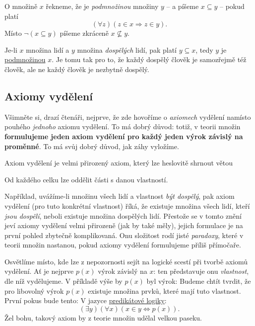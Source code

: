 \begin{definition}[Podmnožina]
  \label{def:podmnozina}
  O množině $x$ řekneme, že je \emph{podmnožinou} množiny $y$ -- a píšeme $x
  \subseteq y$ -- pokud platí
  \begin{equation}
    \label{eq:podmnozina}
    ( \forall z)(z \in x \Rightarrow z \in y).
  \end{equation}
  Místo $\neg (x \subseteq y)$ píšeme zkráceně $x \nsubseteq y$.
\end{definition}
\begin{example}
  \label{exam:podmnozina}
  Je-li $x$ množina lidí a $y$ množina \emph{dospělých} lidí, pak platí $y
  \subseteq x$, tedy $y$ je \hyperref[def:podmnozina]{podmnožinou} $x$. Je tomu
  tak pro to, že každý dospělý člověk je samozřejmě též člověk, ale ne každý
  člověk je nezbytně dospělý.
\end{example}

\subsection{Axiomy vydělení}
\label{ssec:axiomy-vydeleni}

Všimněte si, drazí čtenáři, nejprve, že zde hovoříme o \emph{axiomech} vydělení
namísto pouhého \emph{jednoho} axiomu vydělení. To má dobrý důvod: totiž, v
teorii množin \textbf{formulujeme jeden axiom vydělení pro každý jeden výrok
závislý na proměnné}. To má svůj dobrý důvod, jak záhy vyložíme.

Axiom vydělení je velmi přirozený axiom, který lze heslovitě shrnout větou
\begin{highlightBox}
  \alert{Od každého celku lze oddělit části s danou vlastností.}
\end{highlightBox}
Například, uvážíme-li množinu všech lidí a vlastnost \emph{být dospělý}, pak
axiom vydělení (pro tuto konkrétní vlastnost) říká, že existuje množina všech
lidí, kteří \emph{jsou dospělí}, neboli existuje množina dospělých lidí.
Přestože se v tomto znění jeví axiomy vydělení velmi přirozeně (jak by také
měly), jejich formulace je na první pohled zbytečně komplikovaná. Onu složitost
rodí jisté \emph{paradoxy}, které v teorii množin nastanou, pokud axiomy
vydělení formulujeme příliš přímočaře.

Osvětlíme místo, kde lze z nepozornosti sejít na logické scestí při tvorbě
axiomů vydělení. Ať je nejprve $p(x)$ výrok závislý na $x$: ten představuje onu
\emph{vlastnost}, dle níž vydělujeme. V příkladě výše by $p(x)$ byl výrok:
 Budeme chtít tvrdit, že pro libovolný výrok $p(x)$ existuje
množina prvků, které mají tuto vlastnost. První pokus bude tento:  V
jazyce
\hyperref[def:predikatova-logika]{predikátové logiky}:
\begin{equation}
  \label{eq:russelluv-paradox}
  ( \exists y)( \forall x)(x \in y \Leftrightarrow p(x)).
\end{equation}
Žel bohu, takový axiom by z teorie množin udělal velkou paseku.

